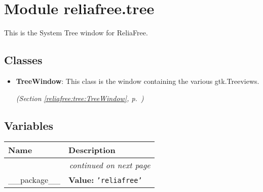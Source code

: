 %
%
%


\section{Module reliafree.tree}

    \label{reliafree:tree}
This is the System Tree window for ReliaFree.



\subsection{Classes}

\begin{itemize}  \setlength{\parskip}{0ex}
  \item \textbf{TreeWindow}: This class is the window containing the various gtk.Treeviews.



  \textit{(Section \ref{reliafree:tree:TreeWindow}, p.~\pageref{reliafree:tree:TreeWindow})}

\end{itemize}


  \subsection{Variables}

    \vspace{-1cm}
\hspace{\varindent}\begin{longtable}{|p{\varnamewidth}|p{\vardescrwidth}|l}
\cline{1-2}
\cline{1-2} \centering \textbf{Name} & \centering \textbf{Description}& \\
\cline{1-2}
\endhead\cline{1-2}\multicolumn{3}{r}{\small\textit{continued on next page}}\\\endfoot\cline{1-2}
\endlastfoot\raggedright \_\-\_\-p\-a\-c\-k\-a\-g\-e\-\_\-\_\- & \raggedright \textbf{Value:} 
{\tt \texttt{'}\texttt{reliafree}\texttt{'}}&\\
\cline{1-2}
\end{longtable}

